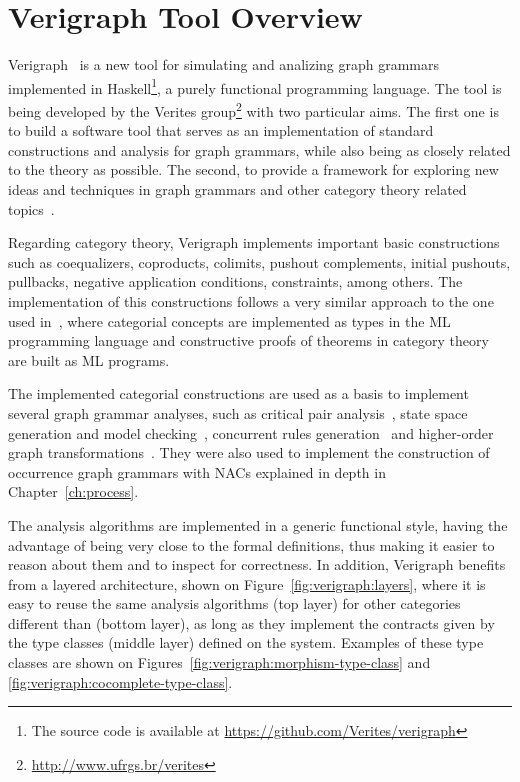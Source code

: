 \chapter{Verigraph Tool Overview}\label{ch:verigraph}

Verigraph~\cite{verigraph} is a new tool for simulating and analizing graph grammars implemented in Haskell\footnote{The source code is available at \url{https://github.com/Verites/verigraph}}, a purely functional programming language. The tool is being developed by the Verites group\footnote{\url{http://www.ufrgs.br/verites}} with two particular aims. The first one is to build a software tool that serves as an implementation of standard constructions and analysis for graph grammars, while also being as closely related to the theory as possible. The second, to provide a framework for exploring new ideas and techniques in graph grammars and other category theory related topics~\cite{BezerraETMF2016,Costa2016,CostaETMF2016, Becker2014}.

Regarding category theory, Verigraph implements important basic constructions such as coequalizers, coproducts, colimits, pushout complements, initial pushouts, pullbacks, negative application conditions, constraints, among others. The implementation of this constructions follows a very similar approach to the one used in~\cite{Rydeheard1988}, where categorial concepts are implemented as types in the ML programming language and constructive proofs of theorems in category theory are built as ML programs.

The implemented categorial constructions are used as a basis to implement several graph grammar analyses, such as critical pair analysis~\cite{Lambers2006}, state space generation and model checking~\cite{Becker2014}, concurrent rules generation~\cite{BezerraETMF2016} and higher-order graph transformations~\cite{Machado2015}. They were also used to implement the construction of occurrence graph grammars with NACs explained in depth in Chapter~\ref{ch:process}.

The analysis algorithms are implemented in a generic functional style, having the advantage of being very close to the formal definitions, thus making it easier to reason about them and to inspect for correctness. 
In addition, Verigraph benefits from a layered architecture, shown on Figure~\ref{fig:verigraph:layers}, where it is easy to reuse the same analysis algorithms (top layer) for other categories different than  (bottom layer), as long as they implement the contracts given
by the type classes (middle layer) defined on the system.
Examples of these type classes are shown on Figures~\ref{fig:verigraph:morphism-type-class} and \ref{fig:verigraph:cocomplete-type-class}.

